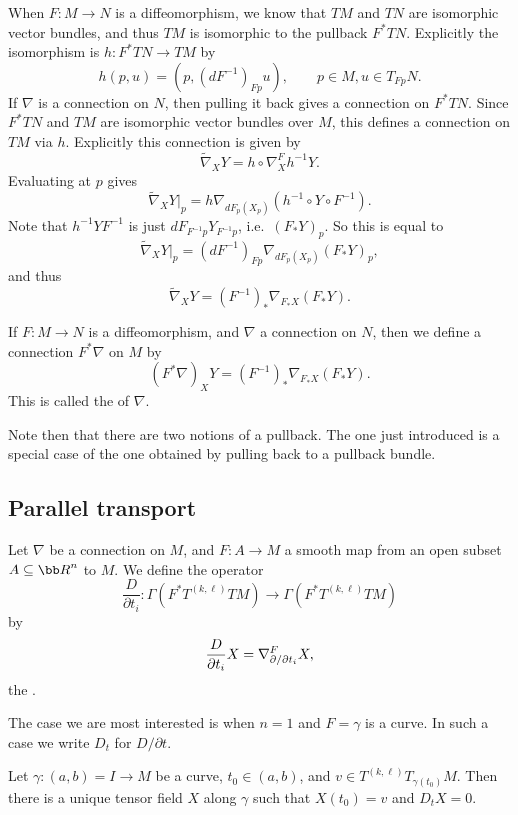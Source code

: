 When $F\colon M\to N$ is a diffeomorphism, we know that $TM$ and $TN$ are isomorphic vector bundles, and thus $TM$ is isomorphic to the pullback
$F^*TN$.
Explicitly the isomorphism is $h\colon F^*TN\to TM$ by
$$ h(p,u) = (p,(dF^{-1})_{Fp}u),\qquad p\in M,u\in T_{Fp}N . $$
If $\nabla$ is a connection on $N$, then pulling it back gives a connection on $F^*TN$.
Since $F^*TN$ and $TM$ are isomorphic vector bundles over $M$, this defines a connection on $TM$ via $h$.
Explicitly this connection is given by
$$ \tilde\nabla_XY = h\circ\nabla^F_Xh^{-1}Y . $$
Evaluating at $p$ gives
$$ \tilde\nabla_XY|_p = h\nabla_{dF_p(X_p)}(h^{-1}\circ Y\circ F^{-1}) . $$
Note that $h^{-1}YF^{-1}$ is just $dF_{F^{-1}p}Y_{F^{-1}p}$, i.e.\ $(F_*Y)_p$.
So this is equal to
$$ \tilde\nabla_XY|_p = (dF^{-1})_{Fp}\nabla_{dF_p(X_p)}(F_*Y)_p , $$
and thus
$$ \tilde\nabla_XY = (F^{-1})_*\nabla_{F_*X}(F_*Y) . $$

\bprop

    If $F\colon M\to N$ is a diffeomorphism, and $\nabla$ a connection on $N$, then we define a connection $F^*\nabla$ on $M$ by
    $$ (F^*\nabla)_XY = (F^{-1})_*\nabla_{F_*X}(F_*Y) . $$
    This is called the  of $\nabla$.

\eprop

Note then that there are two notions of a pullback.
The one just introduced is a special case of the one obtained by pulling back to a pullback bundle.

\subsection{Parallel transport}

\bdefn

    Let $\nabla$ be a connection on $M$, and $F\colon A\to M$ a smooth map from an open subset $A\subseteq\bR^n$ to $M$.
    We define the operator
    $$ \frac D{\partial t_i} \colon \Gamma(F^*T^{(k,\ell)}TM) \to \Gamma(F^*T^{(k,\ell)}TM) $$
    by
    $$ {{D}\over{\partial t_i}}X = \nabla^F_{\partial /\partial t_i}X , $$
    the .

\edefn

The case we are most interested is when $n=1$ and $F=\gamma$ is a curve.
In such a case we write $D_t$ for $D/{\partial t}$.

\bthrm[title=Existence and uniqueness of parallel transport]

    Let $\gamma\colon(a,b)=I\to M$ be a curve, $t_0\in(a,b)$, and $v\in T^{(k,\ell)}T_{\gamma(t_0)}M$.
    Then there is a unique tensor field $X$ along $\gamma$ such that $X(t_0)=v$ and $D_tX=0$.

